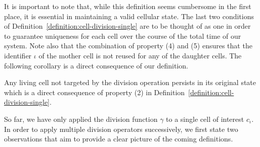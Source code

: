 It is important to note that, while this definition seems cumbersome in the first place, it is
essential in maintaining a valid cellular state.
The last two conditions of Definition~\ref{definition:cell-division-single} are to be thought of as
one in order to guarantee uniqueness for each cell over the course of the total time of our system.
Note also that the combination of property (4) and (5) ensures that the identifier $\iota$ of the
mother cell is not reused for any of the daughter cells.
The following corollary is a direct consequence of our definition.

\begin{corollary}
    Any living cell not targeted by the division operation persists in its original state which is
    a direct consequence of property (2) in Definition~\ref{definition:cell-division-single}.
\end{corollary}

So far, we have only applied the division function $\gamma$ to a single cell of interest $c_\iota$.
In order to apply multiple division operators successively, we first state two observations that
aim to provide a clear picture of the coming definitions.

